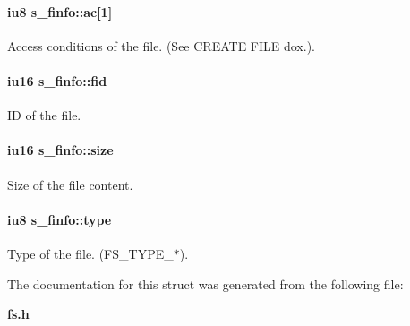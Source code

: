 \paragraph{\setlength{\rightskip}{0pt plus 5cm}\bf{iu8} \bf{s\_\-finfo::ac}[1]}\hfill\label{structs__finfo_1f5a3947c58b7f6f5be099bf2e84b1aa}


Access conditions of the file. (See CREATE FILE dox.). 

\paragraph{\setlength{\rightskip}{0pt plus 5cm}\bf{iu16} \bf{s\_\-finfo::fid}}\hfill\label{structs__finfo_864b248ae358e708aec64b7d7ddc35f3}


ID of the file. 

\paragraph{\setlength{\rightskip}{0pt plus 5cm}\bf{iu16} \bf{s\_\-finfo::size}}\hfill\label{structs__finfo_e59b244a2c42920a988419568a0d4ab5}


Size of the file content. 

\paragraph{\setlength{\rightskip}{0pt plus 5cm}\bf{iu8} \bf{s\_\-finfo::type}}\hfill\label{structs__finfo_41bbc495939ea65ac01a8e210bf9a47c}


Type of the file. (FS\_\-TYPE\_\-$\ast$). 



The documentation for this struct was generated from the following file:\begin{CompactItemize}
\item 
\bf{fs.h}\end{CompactItemize}
